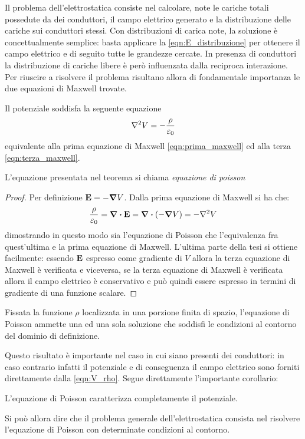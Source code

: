 Il problema dell'elettrostatica consiste nel calcolare, note le cariche totali possedute da dei conduttori,
il campo elettrico generato e la distribuzione delle cariche sui conduttori stessi.
Con distribuzioni di carica note, la soluzione è concettualmente semplice: basta applicare la \eqref{eqn:E_distribuzione}
per ottenere il campo elettrico e di seguito tutte le grandezze cercate. In presenza di conduttori
la distribuzione di cariche libere è però influenzata dalla reciproca interazione. Per riuscire a risolvere il problema
risultano allora di fondamentale importanza le due equazioni di Maxwell trovate.
\begin{thm}
Il potenziale soddisfa la seguente equazione
\begin{equation}
\laplacian V=-\frac{\rho}{\epsilon_0}
\end{equation}
equivalente alla prima equazione di Maxwell \eqref{eqn:prima_maxwell} ed alla terza \eqref{eqn:terza_maxwell}.
\end{thm}
L'equazione presentata nel teorema si chiama \textit{equazione di poisson}
\begin{proof}
  Per definizione $\vb{E}=-\grad{V}$. Dalla prima equazione di Maxwell si ha che:
  \[
  \frac{\rho}{\epsilon_0}=\div{\vb{E}}=\div{(-\grad{V})}=-\laplacian{V}
  \]
  dimostrando in questo modo sia l'equazione di Poisson che l'equivalenza fra quest'ultima e la prima equazione di Maxwell.
    L'ultima parte della tesi si ottiene facilmente: essendo $\vb{E}$ espresso come gradiente di $V$ allora
    la terza equazione di Maxwell è verificata e viceversa, se la terza equazione di Maxwell è verificata
    allora il campo elettrico è conservativo e può quindi essere espresso in termini di gradiente di una funzione scalare.
\end{proof}

\begin{thm}
Fissata la funzione $\rho$ localizzata in una porzione finita di spazio, l'equazione di Poisson ammette
    una ed una sola soluzione che soddisfi le condizioni al contorno del dominio di definizione.
\end{thm}
Questo risultato è importante nel caso in cui siano presenti dei conduttori: in caso contrario infatti
il potenziale e di conseguenza il campo elettrico sono forniti direttamente dalla \ref{eqn:V_rho}.
Segue direttamente l'importante corollario:
\begin{cor}
  L'equazione di Poisson caratterizza completamente il potenziale.
\end{cor}
Si può allora dire che il problema generale dell'elettrostatica consista nel risolvere l'equazione di Poisson
con determinate condizioni al contorno.

